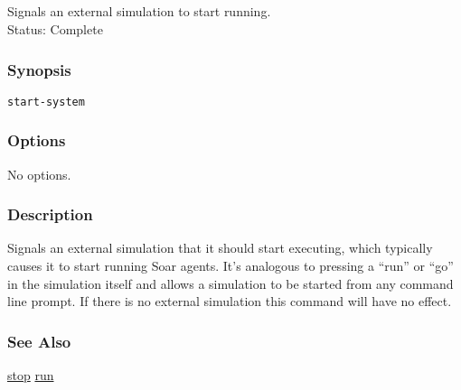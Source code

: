 \subsection{}
\label{start-system}
Signals an external simulation to start running. \\ 
Status: Complete 
\subsubsection*{Synopsis}
\begin{verbatim}
start-system
\end{verbatim}
\subsubsection*{Options}
 No options. 
\subsubsection*{Description}
 Signals an external simulation that it should start executing, which typically causes it to start running Soar agents. It's analogous to pressing a ``run'' or ``go'' in the simulation itself and allows a simulation to be started from any command line prompt. If there is no external simulation this command will have no effect. 
\subsubsection*{See Also}
\hyperref[stop]{stop} \hyperref[run]{run} 